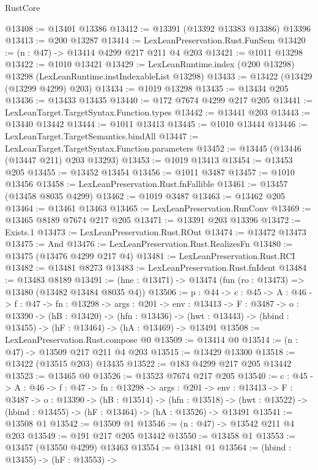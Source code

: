 \begin{lexlean}{RustCore}
\begin{coremodule}
@13408 := @13401 @13386
@13412 := @13391 (@13392 @13383 @13386) @13396
@13413 := @200 @13287
@13414 := LexLeanPreservation.Rust.FunSem
@13420 := (n : @47) -> @13414 @4299 @217 @211 @4 @203
@13421 := @1011 @13298
@13422 := @1010 @13421
@13429 := LexLeanRuntime.index (@200 @13298) @13298 (LexLeanRuntime.instIndexableList @13298)
@13433 := @13422 (@13429 (@13299 @4299) @203)
@13434 := @1019 @13298
@13435 := @13434 @205
@13436 := @13433 @13435
@13440 := @172 @7674 @4299 @217 @205
@13441 := LexLeanTarget.TargetSyntax.Function.types
@13442 := @13441 @203
@13443 := @13440 @13442
@13444 := @1011 @13413
@13445 := @1010 @13444
@13446 := LexLeanTarget.TargetSemantics.bindAll
@13447 := LexLeanTarget.TargetSyntax.Function.parameters
@13452 := @13445 (@13446 (@13447 @211) @203 @13293)
@13453 := @1019 @13413
@13454 := @13453 @205
@13455 := @13452 @13454
@13456 := @1011 @3487
@13457 := @1010 @13456
@13458 := LexLeanPreservation.Rust.fnFallible
@13461 := @13457 (@13458 @8035 @4299)
@13462 := @1019 @3487
@13463 := @13462 @205
@13464 := @13461 @13463
@13465 := LexLeanPreservation.RunConv
@13469 := @13465 @8189 @7674 @217 @205
@13471 := @13391 @203 @13396
@13472 := Exists.{1}
@13473 := LexLeanPreservation.Rust.ROut
@13474 := @13472 @13473
@13475 := And
@13476 := LexLeanPreservation.Rust.RealizesFn
@13480 := @13475 (@13476 @4299 @217 @4)
@13481 := LexLeanPreservation.Rust.RCI
@13482 := @13481 @8273
@13483 := LexLeanPreservation.Rust.fnIdent
@13484 := @13483 @8189
@13491 := (hne : @13471) -> @13474 (fun (ro : @13473) => @13480 (@13482 @13484 @8035 @4))
@13506 := {p : @44} ->
  {c : @45} ->
  {A : @46} ->
  {f : @47} ->
  {fn : @13298} ->
  {args : @201} ->
  {env : @13413} ->
  {F : @3487} ->
  {o : @13390} ->
  (hB : @13420) ->
  (hfn : @13436) -> (hwt : @13443) -> (hbind : @13455) -> (hF : @13464) -> (hA : @13469) -> @13491
@13508 := LexLeanPreservation.Rust.compose @0
@13509 := @13414 @0
@13514 := (n : @47) -> @13509 @217 @211 @4 @203
@13515 := @13429 @13300
@13518 := @13422 (@13515 @203) @13435
@13522 := @183 @4299 @217 @205 @13442
@13523 := @13465 @0
@13526 := @13523 @7674 @217 @205
@13540 := {c : @45} ->
  {A : @46} ->
  {f : @47} ->
  {fn : @13298} ->
  {args : @201} ->
  {env : @13413} ->
  {F : @3487} ->
  {o : @13390} ->
  (hB : @13514) ->
  (hfn : @13518) -> (hwt : @13522) -> (hbind : @13455) -> (hF : @13464) -> (hA : @13526) -> @13491
@13541 := @13508 @1
@13542 := @13509 @1
@13546 := (n : @47) -> @13542 @211 @4 @203
@13549 := @191 @217 @205 @13442
@13550 := @13458 @1
@13553 := @13457 (@13550 @4299) @13463
@13554 := @13481 @1
@13564 := (hbind : @13455) ->
  (hF : @13553) ->

\end{coremodule}
\end{lexlean}
